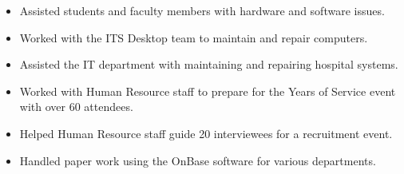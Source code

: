 \documentclass[10pt,letter]{altacv}
\begin{document}


\smallskip






\begin{itemize}
  \item Assisted students and faculty members with hardware and software issues.
  \item Worked with the ITS Desktop team to maintain and repair computers.
\end{itemize}

\divider

\begin{itemize}
  \item Assisted the IT department with maintaining and repairing hospital systems.
  \item Worked with Human Resource staff to prepare for the Years of Service event with over 60 attendees.
  \item Helped Human Resource staff guide 20 interviewees for a recruitment event.
  \item Handled paper work using the OnBase software for various departments.
\end{itemize}
\end{document}
